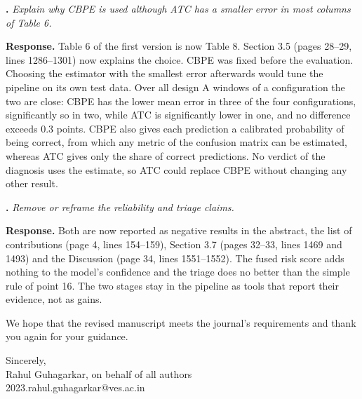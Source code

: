 \documentclass[11pt,a4paper]{article}
\newcounter{point}
\newcommand{\point}[1]{\par\medskip\stepcounter{point}\textbf{\thepoint. }\textit{#1}\par}
\newcommand{\reply}{\textbf{Response. }}
\begin{document}
\point{Explain why CBPE is used although ATC has a smaller error in most columns of Table 6.}
\reply Table 6 of the first version is now Table 8. Section 3.5 (pages 28--29, lines 1286--1301) now explains the choice. CBPE was fixed before the evaluation. Choosing the estimator with the smallest error afterwards would tune the pipeline on its own test data. Over all design A windows of a configuration the two are close: CBPE has the lower mean error in three of the four configurations, significantly so in two, while ATC is significantly lower in one, and no difference exceeds 0.3 points. CBPE also gives each prediction a calibrated probability of being correct, from which any metric of the confusion matrix can be estimated, whereas ATC gives only the share of correct predictions. No verdict of the diagnosis uses the estimate, so ATC could replace CBPE without changing any other result.

\point{Remove or reframe the reliability and triage claims.}
\reply Both are now reported as negative results in the abstract, the list of contributions (page 4, lines 154--159), Section 3.7 (pages 32--33, lines 1469 and 1493) and the Discussion (page 34, lines 1551--1552). The fused risk score adds nothing to the model's confidence and the triage does no better than the simple rule of point 16. The two stages stay in the pipeline as tools that report their evidence, not as gains.

\medskip
We hope that the revised manuscript meets the journal's requirements and thank you again for your guidance.

Sincerely,\\
Rahul Guhagarkar, on behalf of all authors\\
2023.rahul.guhagarkar@ves.ac.in
\end{document}
